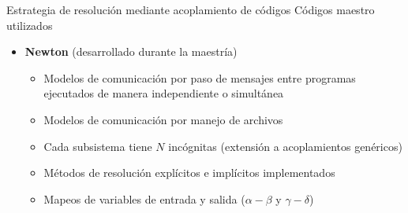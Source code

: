 \begin{frame}
{Estrategia de resolución mediante acoplamiento de códigos}
{Códigos maestro utilizados}

\begin{itemize}
\item \textbf{Newton} (desarrollado durante la maestría)
  \begin{itemize}
  \item <1-> Modelos de comunicación por paso de mensajes entre programas ejecutados de manera independiente o simultánea
  \item <2-> Modelos de comunicación por manejo de archivos
  \item <3-> Cada subsistema tiene $N$ incógnitas (extensión a acoplamientos genéricos)
  \item <4-> Métodos de resolución explícitos e implícitos implementados
  \item <5-> Mapeos de variables de entrada y salida ($\alpha-\beta$ y $\gamma-\delta$)
  \end{itemize}
\end{itemize}

\centering{}

\end{frame}
